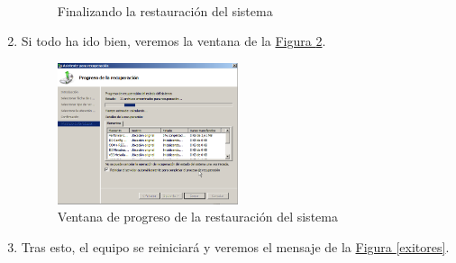\documentclass[10pt,a4paper,spanish]{article}
\numberwithin{equation}{section} %
\numberwithin{figure}{section} %
\numberwithin{table}{section} %
\begin{document}
\begin{enumerate}[1.]
    \begin{figure}[!h]
    \centering
    \mbox {
    \qquad
    }
    \caption{Finalizando la restauración del sistema}
    \label{finres}
    \end{figure}

\item Si todo ha ido bien, veremos la ventana de la \hyperref[ventanares]{Figura \ref*{ventanares}}.

    \begin{figure}[!h]
        \centering
        \includegraphics[width=0.5\textwidth]{17}
        \caption{Ventana de progreso de la restauración del sistema}
        \label{ventanares}
    \end{figure}

\item Tras esto, el equipo se reiniciará y veremos el mensaje de la \hyperref[exitores]{Figura \ref*{exitores}}.


\end{enumerate}
\end{document}
